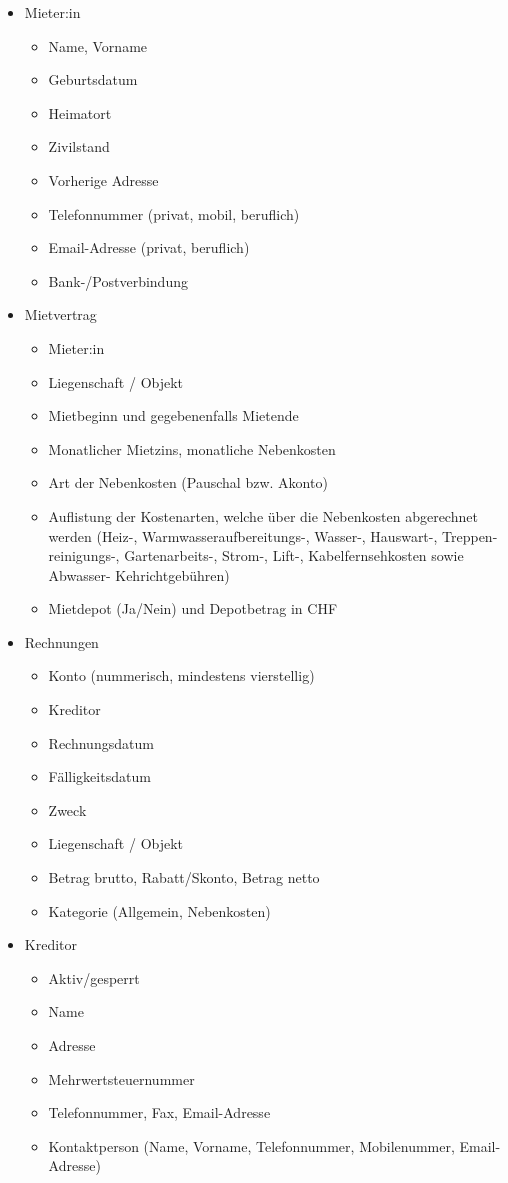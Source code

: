 \begin{itemize}
  \item Mieter:in
  \begin{itemize}
    \item Name, Vorname 
    \item Geburtsdatum
    \item Heimatort 
    \item Zivilstand
    \item Vorherige Adresse
    \item Telefonnummer (privat, mobil, beruflich)
    \item Email-Adresse (privat, beruflich)
    \item Bank-/Postverbindung
  \end{itemize}
  \item Mietvertrag
  \begin{itemize}
    \item Mieter:in
    \item Liegenschaft / Objekt
    \item Mietbeginn und gegebenenfalls Mietende
    \item Monatlicher Mietzins, monatliche Nebenkosten
    \item Art der Nebenkosten (Pauschal bzw. Akonto)
    \item Auflistung der Kostenarten, welche über die Nebenkosten abgerechnet werden (Heiz-, Warmwasseraufbereitungs-, Wasser-, Hauswart-, Treppen-reinigungs-, Gartenarbeits-, Strom-, Lift-, Kabelfernsehkosten sowie Abwasser- Kehrichtgebühren)
    \item Mietdepot (Ja/Nein) und Depotbetrag in CHF
  \end{itemize}
  \newpage
  \item Rechnungen
  \begin{itemize}
    \item Konto (nummerisch, mindestens vierstellig)
    \item Kreditor
    \item Rechnungsdatum
    \item Fälligkeitsdatum
    \item Zweck
    \item Liegenschaft / Objekt
    \item Betrag brutto, Rabatt/Skonto, Betrag netto
    \item Kategorie (Allgemein, Nebenkosten)
  \end{itemize}
  \item Kreditor
  \begin{itemize}
    \item Aktiv/gesperrt
    \item Name
    \item Adresse
    \item Mehrwertsteuernummer
    \item Telefonnummer, Fax, Email-Adresse
    \item Kontaktperson (Name, Vorname, Telefonnummer, Mobilenummer, Email-Adresse)
  \end{itemize}
\end{itemize}

